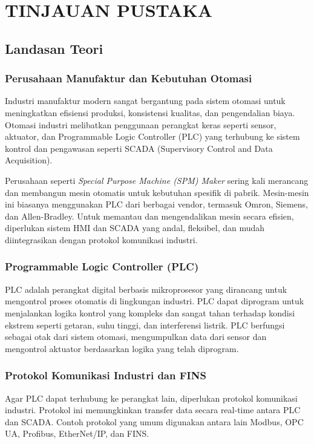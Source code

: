 \chapter{TINJAUAN PUSTAKA}

\section{Landasan Teori}

\subsection{Perusahaan Manufaktur dan Kebutuhan Otomasi}
Industri manufaktur modern sangat bergantung pada sistem otomasi untuk meningkatkan efisiensi produksi, konsistensi kualitas, dan pengendalian biaya. Otomasi industri melibatkan penggunaan perangkat keras seperti sensor, aktuator, dan Programmable Logic Controller (PLC) yang terhubung ke sistem kontrol dan pengawasan seperti SCADA (Supervisory Control and Data Acquisition).

Perusahaan seperti \textit{Special Purpose Machine (SPM) Maker} sering kali merancang dan membangun mesin otomatis untuk kebutuhan spesifik di pabrik. Mesin-mesin ini biasanya menggunakan PLC dari berbagai vendor, termasuk Omron, Siemens, dan Allen-Bradley. Untuk memantau dan mengendalikan mesin secara efisien, diperlukan sistem HMI dan SCADA yang andal, fleksibel, dan mudah diintegrasikan dengan protokol komunikasi industri.

\subsection{Programmable Logic Controller (PLC)}
PLC adalah perangkat digital berbasis mikroprosesor yang dirancang untuk mengontrol proses otomatis di lingkungan industri. PLC dapat diprogram untuk menjalankan logika kontrol yang kompleks dan sangat tahan terhadap kondisi ekstrem seperti getaran, suhu tinggi, dan interferensi listrik. PLC berfungsi sebagai otak dari sistem otomasi, mengumpulkan data dari sensor dan mengontrol aktuator berdasarkan logika yang telah diprogram.

\subsection{Protokol Komunikasi Industri dan FINS}
Agar PLC dapat terhubung ke perangkat lain, diperlukan protokol komunikasi industri. Protokol ini memungkinkan transfer data secara real-time antara PLC dan SCADA. Contoh protokol yang umum digunakan antara lain Modbus, OPC UA, Profibus, EtherNet/IP, dan FINS.

